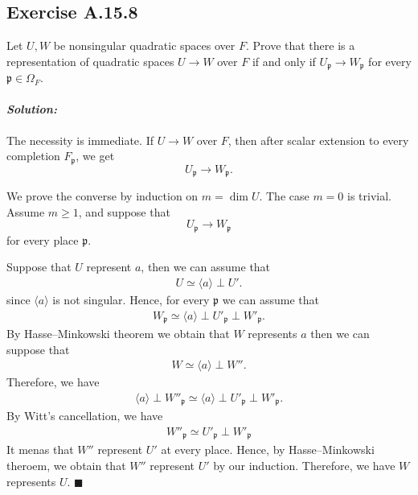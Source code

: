 \documentclass[12pt, a4paper]{article}
\newenvironment{solution}
  {\paragraph{\textit{Solution:}}\par\medskip}
  {\hfill$\blacksquare$\vspace{0.1cm}}
\begin{document}
\subsection*{Exercise A.15.8}
Let $U, W$ be nonsingular quadratic spaces over $F$. Prove that there is a representation of quadratic spaces $U \to W$ over $F$ if and only if $U_{\mathfrak{p}} \to W_{\mathfrak{p}}$ for every $\mathfrak{p} \in \Omega_F$.
\begin{solution}
The necessity is immediate. If \(U\to W\) over \(F\), then after scalar
extension to every completion \(F_{\mathfrak p}\), we get
\[
U_{\mathfrak p}\to W_{\mathfrak p}.
\]

We prove the converse by induction on \(m=\dim U\). The case \(m=0\) is
trivial. Assume \(m\ge 1\), and suppose that
\[
U_{\mathfrak p}\to W_{\mathfrak p}
\]
for every place \(\mathfrak p\).

Suppose that $U$ represent $a$, then we can assume that 
\begin{align*}
    U \simeq \langle a \rangle \perp U'.
\end{align*}
since $\langle a \rangle$ is not singular. Hence, for every $\mathfrak{p}$ we can assume that 
\begin{align*}
    W_{\mathfrak{p}} \simeq\langle a \rangle \perp U'_{\mathfrak{p}} \perp W'_{\mathfrak{p}}.
\end{align*}
By Hasse–Minkowski theorem we obtain that $W$ represents $a$ then we can suppose that 
\begin{align*}
    W\simeq \langle a \rangle \perp  W''.
\end{align*}
Therefore, we have 
\begin{align*}
    \langle a \rangle \perp  W''_{\mathfrak{p}} \simeq \langle a \rangle \perp U'_{\mathfrak{p}} \perp W'_{\mathfrak{p}}.
\end{align*}
By Witt's cancellation, we have 
\begin{align*}
    W''_{\mathfrak{p}} \simeq U'_{\mathfrak{p}} \perp W'_{\mathfrak{p}}
\end{align*}
It menas that $W''$ represent $U'$ at every place. Hence, by Hasse–Minkowski theroem, we obtain that $W''$ represent $U'$ by our induction.
Therefore, we have $W$ represents $U$.
\end{solution}
\end{document}

